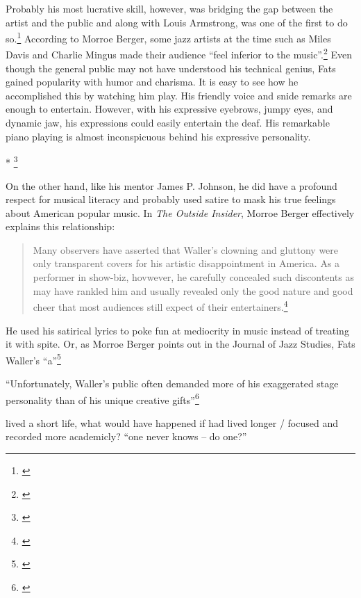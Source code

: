 \documentclass[11pt]{report}
\begin{document}
	\label{sec:charisma}
	Probably his most lucrative skill, however, was bridging the gap between the artist and the public and along with Louis Armstrong, was one of the first to do so.\footnote{\cite[3]{life}} According to Morroe Berger, some jazz artists at the time such as Miles Davis and Charlie Mingus made their audience ``feel inferior to the music''.\footnote{\cite[16]{outside-insider}} Even though the general public may not have understood his technical genius, Fats gained popularity with humor and charisma. It is easy to see how he accomplished this by watching him play. His friendly voice and snide remarks are enough to entertain. However, with his expressive eyebrows, jumpy eyes, and dynamic jaw, his expressions could easily entertain the deaf. His remarkable piano playing is almost inconspicuous behind his expressive personality.
	
	* \footnote{\cite{youtube-joint_is_jumpin}}
	
		
	\label{sec:respect}
	
	On the other hand, like his mentor James P. Johnson, he did have a profound respect for musical literacy and probably used satire to mask his true feelings about American popular music. In \emph{The Outside Insider}, Morroe Berger effectively explains this relationship:
	\begin{quote}
		Many observers have asserted that Waller's clowning and gluttony were only transparent covers for his artistic disappointment in America. As a performer in show-biz, hovwever, he carefully concealed such discontents as may have rankled him and usually revealed only the good nature and good cheer that most audiences still expect of their entertainers.\footnote{\cite[4]{outside-insider}}
	\end{quote}

	He used his satirical lyrics to poke fun at mediocrity in music instead of treating it with spite. Or, as Morroe Berger points out in the Journal of Jazz Studies, Fats Waller's ``a''\footnote{\cite[4]{outside-insider}}


	\label{sec:conclusion}

	``Unfortunately, Waller's public often demanded more of his exaggerated stage personality than of his unique creative gifts''\footnote{\cite[40]{grove-book:waller}}

	lived a short life, what would have happened if had lived longer / focused and recorded more academicly? ``one never knows -- do one?''



\end{document}

